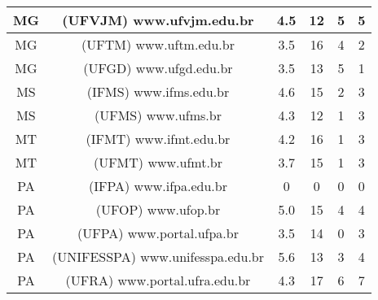\begin{center}
\begin{longtable}{|c|l|l|l|l|l|}
\hline
\multicolumn{1}{|c|}{MG} & \multicolumn{1}{c|}{(UFVJM) www.ufvjm.edu.br} & \multicolumn{1}{c|}{4.5} & \multicolumn{1}{c|}{12} & \multicolumn{1}{c|}{5} & \multicolumn{1}{c|}{5} \\ 
\hline
\multicolumn{1}{|c|}{MG} & \multicolumn{1}{c|}{(UFTM) www.uftm.edu.br} & \multicolumn{1}{c|}{3.5} & \multicolumn{1}{c|}{16} & \multicolumn{1}{c|}{4} & \multicolumn{1}{c|}{2} \\ 
\hline
\multicolumn{1}{|c|}{MG} & \multicolumn{1}{c|}{(UFGD) www.ufgd.edu.br} & \multicolumn{1}{c|}{3.5} & \multicolumn{1}{c|}{13} & \multicolumn{1}{c|}{5} & \multicolumn{1}{c|}{1} \\ 
\hline
\multicolumn{1}{|c|}{MS} & \multicolumn{1}{c|}{(IFMS) www.ifms.edu.br} & \multicolumn{1}{c|}{4.6} & \multicolumn{1}{c|}{15} & \multicolumn{1}{c|}{2} & \multicolumn{1}{c|}{3} \\ 
\hline
\multicolumn{1}{|c|}{MS} & \multicolumn{1}{c|}{(UFMS) www.ufms.br} & \multicolumn{1}{c|}{4.3} & \multicolumn{1}{c|}{12} & \multicolumn{1}{c|}{1} & \multicolumn{1}{c|}{3} \\ 
\hline
\multicolumn{1}{|c|}{MT} & \multicolumn{1}{c|}{(IFMT) www.ifmt.edu.br} & \multicolumn{1}{c|}{4.2} & \multicolumn{1}{c|}{16} & \multicolumn{1}{c|}{1} & \multicolumn{1}{c|}{3} \\ 
\hline
\multicolumn{1}{|c|}{MT} & \multicolumn{1}{c|}{(UFMT) www.ufmt.br} & \multicolumn{1}{c|}{3.7} & \multicolumn{1}{c|}{15} & \multicolumn{1}{c|}{1} & \multicolumn{1}{c|}{3} \\ 
\hline
\multicolumn{1}{|c|}{PA} & \multicolumn{1}{c|}{(IFPA) www.ifpa.edu.br} & \multicolumn{1}{c|}{0} & \multicolumn{1}{c|}{0} & \multicolumn{1}{c|}{0} & \multicolumn{1}{c|}{0} \\ 
\hline
\multicolumn{1}{|c|}{PA} & \multicolumn{1}{c|}{(UFOP) www.ufop.br} & \multicolumn{1}{c|}{5.0} & \multicolumn{1}{c|}{15} & \multicolumn{1}{c|}{4} & \multicolumn{1}{c|}{4} \\ 
\hline
\multicolumn{1}{|c|}{PA} & \multicolumn{1}{c|}{(UFPA) www.portal.ufpa.br} & \multicolumn{1}{c|}{3.5} & \multicolumn{1}{c|}{14} & \multicolumn{1}{c|}{0} & \multicolumn{1}{c|}{3} \\ 
\hline
\multicolumn{1}{|c|}{PA} & \multicolumn{1}{c|}{(UNIFESSPA) www.unifesspa.edu.br} & \multicolumn{1}{c|}{5.6} & \multicolumn{1}{c|}{13} & \multicolumn{1}{c|}{3} & \multicolumn{1}{c|}{4} \\ 
\hline
\multicolumn{1}{|c|}{PA} & \multicolumn{1}{c|}{(UFRA) www.portal.ufra.edu.br} & \multicolumn{1}{c|}{4.3} & \multicolumn{1}{c|}{17} & \multicolumn{1}{c|}{6} & \multicolumn{1}{c|}{7} \\ 

\end{longtable}
\end{center}
